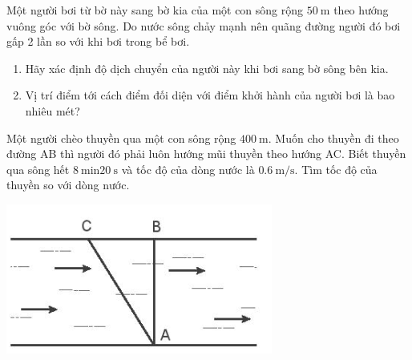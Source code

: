 \begin{ex}
	Một người bơi từ bờ này sang bờ kia của một con sông rộng $\SI{50}{\meter}$ theo hướng vuông góc với bờ sông. Do nước sông chảy mạnh nên quãng đường người đó bơi gấp 2 lần so với khi bơi trong bể bơi.
	\begin{enumerate}[label=\alph*)]
		\item Hãy xác định độ dịch chuyển của người này khi bơi sang bờ sông bên kia.
		\item Vị trí điểm tới cách điểm đối diện với điểm khởi hành của người bơi là bao nhiêu mét?
	\end{enumerate}
\end{ex}
\begin{ex}
	Một người chèo thuyền qua một con sông rộng $\SI{400}{\meter}$. Muốn cho thuyền đi theo đường AB thì người đó phải luôn hướng mũi thuyền theo hướng AC. Biết thuyền qua sông hết $\SI{8}{\minute} \SI{20}{\second}$ và tốc độ của dòng nước là $\SI{0.6}{\meter/\second}$. Tìm tốc độ của thuyền so với dòng nước.
	\begin{center}
		\includegraphics[scale=0.7]{figs/G10Y25B4-5}
	\end{center}
\end{ex}
